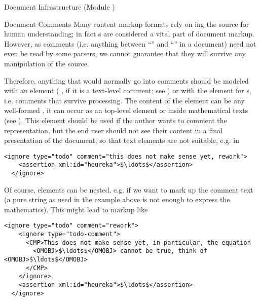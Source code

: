 \begin{tchapter}[id=omdoc-infrastructure,short=Document Infrastructure]{Document Infrastructure (Module {})}
\begin{tsection}[id=comments]{Document Comments}
  Many content markup formats rely on {ing} the source for human
  understanding; in fact {s} are considered a vital part of
  document markup. However, as {\xml} comments (i.e. anything between
  ``{}'' and ``{\snippetin{-->}}'' in a document) need not even be
  read by some {\xml} parsers, we cannot guarantee that they will
  survive any {\xml} manipulation of the {\omdoc} source.

  Therefore, anything that would normally go into comments should be modeled with an
  {} element ({} {},
  if it is a text-level comment; see {}) or with the {}
  element for {s}, i.e.  comments that survive processing.
  The content of the {} element can be any well-formed {\omdoc}, it can
  occur as an {\omdoc} top-level element or inside mathematical texts (see
  {}). This element should be used if the author wants to comment the
  {\omdoc} representation, but the end user should not see their content in a final
  presentation of the document, so that {\omdoc} text elements are not suitable, e.g. in

\begin{lstlisting}[numbers=none,index={ignore},mathescape]
  <ignore type="todo" comment="this does not make sense yet, rework">
    <assertion xml:id="heureka">$\ldots$</assertion>
  </ignore>
\end{lstlisting}

Of course, {} elements can be nested, e.g. if we want to mark up
the comment text (a pure string as used in the example above is not enough to
express the mathematics). This might lead to markup like 

\begin{lstlisting}[label=nested-ignore,numbers=none,index={ignore},mathescape]
  <ignore type="todo" comment="rework">
    <ignore type="todo-comment">
      <CMP>This does not make sense yet, in particular, the equation 
        <OMOBJ>$\ldots$</OMOBJ> cannot be true, think of <OMOBJ>$\ldots$</OMOBJ>
      </CMP>
    </ignore>
    <assertion xml:id="heureka">$\ldots$</assertion>
  </ignore>
\end{lstlisting}


\end{tsection}
\end{tchapter}
